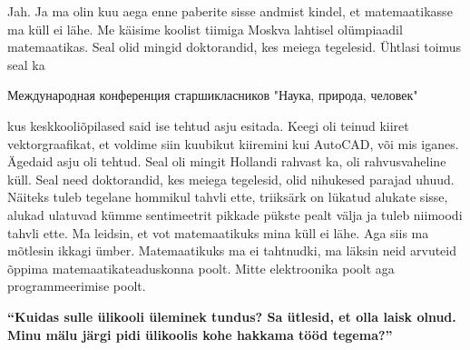 Jah. Ja ma olin kuu aega enne paberite sisse andmist kindel, et matemaatikasse ma küll ei lähe. Me käisime koolist tiimiga Moskva lahtisel olümpiaadil matemaatikas. Seal olid mingid doktorandid, kes meiega tegelesid. Ühtlasi toimus seal ka \begin{russian}Международная конференция старшикласников "Наука, природа, человек"\end{russian} kus keskkooliõpilased said ise tehtud asju esitada. Keegi oli teinud kiiret vektorgraafikat, et voldime siin kuubikut kiiremini kui AutoCAD, või mis iganes. Ägedaid asju oli tehtud. Seal oli mingit Hollandi rahvast ka, oli rahvusvaheline küll. Seal need doktorandid, kes meiega tegelesid, olid nihukesed parajad uhuud. Näiteks tuleb tegelane hommikul tahvli ette, triiksärk on lükatud alukate sisse, alukad ulatuvad kümme sentimeetrit pikkade pükste pealt välja ja tuleb niimoodi tahvli ette. Ma leidsin, et vot matemaatikuks mina küll ei lähe. Aga siis ma mõtlesin ikkagi ümber. Matemaatikuks ma ei tahtnudki, ma läksin neid arvuteid õppima matemaatikateaduskonna poolt. Mitte elektroonika poolt aga programmeerimise poolt. 

\textbf{\enquote{Kuidas sulle ülikooli üleminek tundus? Sa ütlesid, et olla laisk olnud. Minu mälu järgi pidi ülikoolis kohe hakkama tööd tegema?}}

